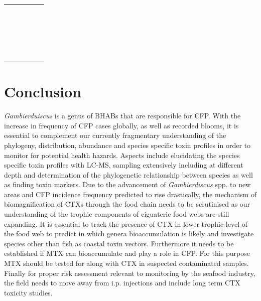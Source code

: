\documentclass[12pt]{article}
\begin{document}
\begin{longtable}{  | p{2cm} | p{3cm} | p{4.5cm}  | p{2cm} | p{3cm}  | }
  & \emph{} &  &  & \\
  &  \emph{} &  &  & \\
  & \emph{}  &  &  & \\
  & \emph{} &  &  & \\
  &  \emph{} &  &  & \\
  & \emph{}  &  &  & \\
  & \emph{} &  &  & \\
  &  \emph{} &  &  & \\
  & \emph{}  &  &  & \\
  & \emph{} &  &  & \\
  &  \emph{} &  &  & \\
  & \emph{}  &  &  & \\
  & \emph{} &  &  & \\
  &  \emph{} &  &  & \\
  & \emph{}  &  &  & \\
  & \emph{} &  &  & \\
  &  \emph{} &  &  & \\
  & \emph{}  &  &  & \\
  & \emph{} &  &  & \\
\end{longtable}

\section{Conclusion}
\emph{Gambierduiscus} is a genus of BHABs that are responsible for CFP. With the increase in frequency of CFP cases globally, as well as recorded blooms, it is essential to complement our currently fragmentary understanding of the phylogeny, distribution, abundance and species specific toxin profiles in order to monitor for potential health hazards. Aspects include elucidating the species specific toxin profiles with LC-MS, sampling extensively including at different depth and determination of the phylogenetic relationship between species as well as finding toxin markers.
Due to the  advancement of \emph{Gambierdiscus} spp. to new areas and CFP incidence frequency predicted to rise drastically, the mechanism of biomagnification of CTXs through the food chain needs to be scrutinised as our understanding of the trophic components of ciguateric food webs are still expanding.
It is essential to track the presence of CTX in lower trophic level of the food web to predict in which genera bioaccumulation is likely \cite{mak2013pacific} and investigate species other than fish as coastal toxin vectors. Furthermore it needs to be established if MTX can bioaccumulate and play a role in CFP. For this purpose MTX should be tested for along with CTX in suspected contaminated samples.
Finally for proper risk assessment relevant to monitoring by the seafood industry, the field needs to move away from i.p. injections and include long term CTX toxicity studies.


\newpage



\end{document}
